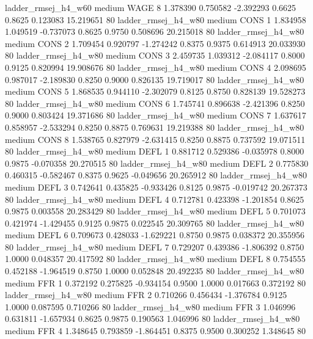   ladder_rmsej_h4_w60     medium     WAGE                 8  1.378390 0.750582 -2.392293 0.6625 0.8625  0.123083   15.219651 80
   ladder_rmsej_h4_w80     medium     CONS                 1  1.834958 1.049519 -0.737073 0.8625 0.9750  0.508696   20.215018 80
   ladder_rmsej_h4_w80     medium     CONS                 2  1.709454 0.920797 -1.274242 0.8375 0.9375  0.614913   20.033930 80
   ladder_rmsej_h4_w80     medium     CONS                 3  2.459735 1.039312 -2.084117 0.8000 0.9125  0.820994   19.908676 80
   ladder_rmsej_h4_w80     medium     CONS                 4  2.098695 0.987017 -2.189830 0.8250 0.9000  0.826135   19.719017 80
   ladder_rmsej_h4_w80     medium     CONS                 5  1.868535 0.944110 -2.302079 0.8125 0.8750  0.828139   19.528273 80
   ladder_rmsej_h4_w80     medium     CONS                 6  1.745741 0.896638 -2.421396 0.8250 0.9000  0.803424   19.371686 80
   ladder_rmsej_h4_w80     medium     CONS                 7  1.637617 0.858957 -2.533294 0.8250 0.8875  0.769631   19.219388 80
   ladder_rmsej_h4_w80     medium     CONS                 8  1.538765 0.827979 -2.631415 0.8250 0.8875  0.737592   19.071511 80
   ladder_rmsej_h4_w80     medium     DEFL                 1  0.881712 0.529386 -0.035978 0.8000 0.9875 -0.070358   20.270515 80
   ladder_rmsej_h4_w80     medium     DEFL                 2  0.775830 0.460315 -0.582467 0.8375 0.9625 -0.049656   20.265912 80
   ladder_rmsej_h4_w80     medium     DEFL                 3  0.742641 0.435825 -0.933426 0.8125 0.9875 -0.019742   20.267373 80
   ladder_rmsej_h4_w80     medium     DEFL                 4  0.712781 0.423398 -1.201854 0.8625 0.9875  0.003558   20.283429 80
   ladder_rmsej_h4_w80     medium     DEFL                 5  0.701073 0.421974 -1.429455 0.9125 0.9875  0.022545   20.309765 80
   ladder_rmsej_h4_w80     medium     DEFL                 6  0.709673 0.428033 -1.629221 0.8750 0.9875  0.038372   20.355956 80
   ladder_rmsej_h4_w80     medium     DEFL                 7  0.729207 0.439386 -1.806392 0.8750 1.0000  0.048357   20.417592 80
   ladder_rmsej_h4_w80     medium     DEFL                 8  0.754555 0.452188 -1.964519 0.8750 1.0000  0.052848   20.492235 80
   ladder_rmsej_h4_w80     medium      FFR                 1  0.372192 0.275825 -0.934154 0.9500 1.0000  0.017663    0.372192 80
   ladder_rmsej_h4_w80     medium      FFR                 2  0.710266 0.456434 -1.376784 0.9125 1.0000  0.087595    0.710266 80
   ladder_rmsej_h4_w80     medium      FFR                 3  1.046996 0.631811 -1.657934 0.8625 0.9875  0.190563    1.046996 80
   ladder_rmsej_h4_w80     medium      FFR                 4  1.348645 0.793859 -1.864451 0.8375 0.9500  0.300252    1.348645 80

